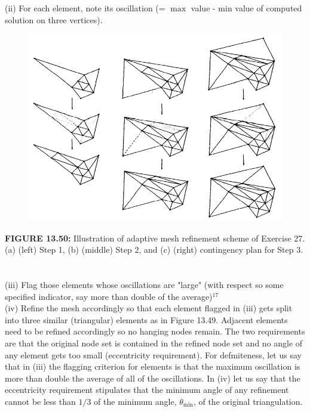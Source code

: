 \documentclass[../main.tex]{subfiles}
\begin{document}
\begin{enumerate}
(ii) For each element, note its oscillation (= $\max$ value - min value of computed solution on three vertices).
\begin{figure}[H]
\includegraphics[width=0.9\linewidth]{37}
	\centering
	\label{pfig:ch13_37}
\end{figure}
\textbf{FIGURE 13.50:} Illustration of adaptive mesh refinement scheme of Exercise 27. (a) (left) Step 1, (b) 
(middle) Step 2, and (c) (right) contingency plan for Step 3. 
\\
\\
\\
(iii) Flag those elements whose oscillations are "large" (with respect so some specified indicator, 
say more than double of the average)$^{17}$\\ 
(iv) Refine the mesh accordingly so that each element flagged in (iii) gets split into three similar 
(triangular) elements as in Figure 13.49. Adjacent elements need to be refined accordingly so 
no hanging nodes remain. The two requirements are that the original node set is contained in the 
refined node set and no angle of any element gets too small (eccentricity requirement). 
For defmiteness, let us say that in (iii) the flagging criterion for elements is that the maximum oscillation is more than double the average of all of the oscillations. In (iv) let us say that the eccentricity requirement stipulates that the minimum angle of any refinement cannot be less than $1 / 3$ of the minimum angle, $\theta_{\min }$, of the original triangulation.\\

\end{enumerate}
\end{document}

